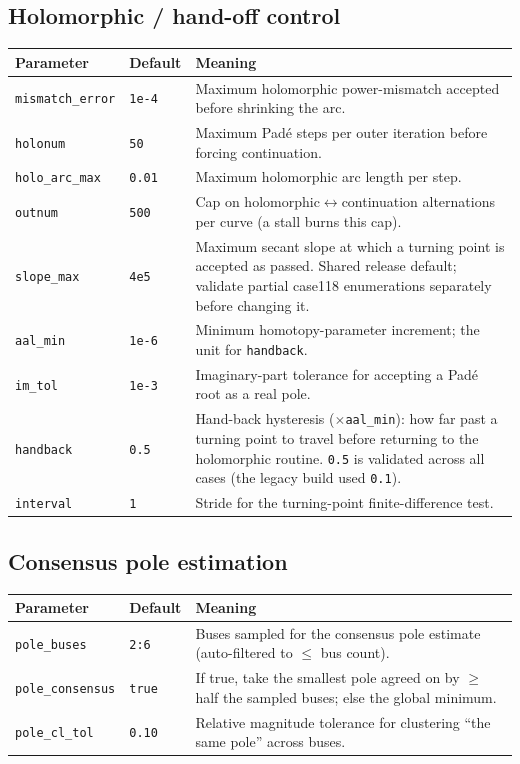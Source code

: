 \documentclass[11pt,a4paper]{article}
\newcommand{\code}[1]{\texttt{#1}}
\begin{document}
\subsection{Holomorphic / hand-off control}
\begin{center}\small
\begin{longtable}{@{}p{}p{}p{}@{}}
\toprule
\textbf{Parameter} & \textbf{Default} & \textbf{Meaning}\\
\midrule\endhead
\code{mismatch_error}& \code{1e-4} & Maximum holomorphic power-mismatch accepted before shrinking the arc.\\
\code{holonum}      & \code{50}   & Maximum Pad\'e steps per outer iteration before forcing continuation.\\
\code{holo_arc_max} & \code{0.01} & Maximum holomorphic arc length per step.\\
\code{outnum}       & \code{500}  & Cap on holomorphic$\leftrightarrow$continuation alternations per curve (a stall burns this cap).\\
\code{slope_max}    & \code{4e5}  & Maximum secant slope at which a turning point is accepted as passed. Shared release default; validate partial case118 enumerations separately before changing it.\\
\code{aal_min}      & \code{1e-6} & Minimum homotopy-parameter increment; the unit for \code{handback}.\\
\code{im_tol}       & \code{1e-3} & Imaginary-part tolerance for accepting a Pad\'e root as a real pole.\\
\code{handback}     & \code{0.5}  & Hand-back hysteresis ($\times$\code{aal_min}): how far past a turning point to travel before returning to the holomorphic routine. \code{0.5} is validated across all cases (the legacy build used \code{0.1}).\\
\code{interval}     & \code{1}    & Stride for the turning-point finite-difference test.\\
\bottomrule
\end{longtable}
\end{center}

\subsection{Consensus pole estimation}
\begin{center}\small
\begin{longtable}{@{}p{}p{}p{}@{}}
\toprule
\textbf{Parameter} & \textbf{Default} & \textbf{Meaning}\\
\midrule\endhead
\code{pole_buses}     & \code{2:6}      & Buses sampled for the consensus pole estimate (auto-filtered to $\le$ bus count).\\
\code{pole_consensus}  & \code{true}     & If true, take the smallest pole agreed on by $\ge$ half the sampled buses; else the global minimum.\\
\code{pole_cl_tol}     & \code{0.10}     & Relative magnitude tolerance for clustering ``the same pole'' across buses.\\
\bottomrule
\end{longtable}
\end{center}
\end{document}
